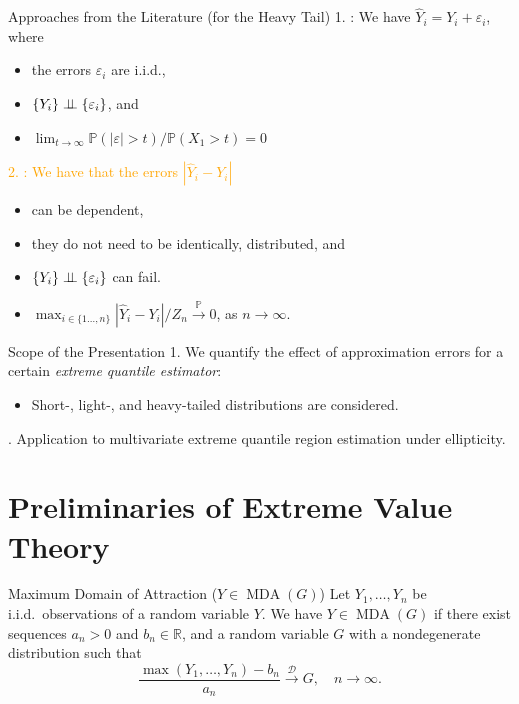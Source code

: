 \documentclass{beamer}
\DeclareMathOperator{\mda}{MDA}
\begin{document}

\begin{frame}{Approaches from the Literature (for the Heavy Tail)}
  1. \parencite{kim2020, kim2023b}: We have $\hat Y_i = Y_i + \varepsilon_i$, where
  \begin{itemize}
    \item the errors $\varepsilon_i$ are i.i.d.,
    \item $\{Y_i\} \perp\kern-5pt \perp\{\varepsilon_i\}$, and
    \item $\lim_{t\to\infty}\mathbb{P}(|\varepsilon| > t)/\mathbb{P}(X_1 > t) = 0$
  \end{itemize}
  \pause
  \textcolor{orange}{2. \parencite{girard2021}: We have that the errors $|\hat
  Y_i - Y_i|$}
  \begin{itemize}
    \item can be dependent,
    \item they do not need to be identically, distributed, and
    \item $\{Y_i\} \perp\kern-5pt \perp\{\varepsilon_i\}$ can fail.
    \item $\max_{i\in\{1\ldots, n\}}|\hat Y_i -
    Y_i|/Z_n\stackrel{\mathbb{P}}{\to} 0$, as $n\to\infty$.
    \end{itemize}
\end{frame}


\begin{frame}{Scope of the Presentation}
  1. We quantify the effect of approximation errors for a certain \emph{extreme
  quantile estimator}:
  \begin{itemize}
    \item Short-, light-, and heavy-tailed distributions are considered. 
  \end{itemize}
  . Application to multivariate extreme quantile region estimation under
  ellipticity.
\end{frame}


\section{Preliminaries of Extreme Value Theory}


\begin{frame}{Maximum Domain of Attraction ($Y\in \mda\left(G\right)$)}
  Let $Y_1, \ldots, Y_n$ be i.i.d.\ observations of a random variable $Y$. We
  have $Y\in\mda\left(G\right)$ if there exist sequences $a_n > 0$ and
  $b_n\in\mathbb{R}$, and a random variable $G$ with a nondegenerate
  distribution such that
\begin{equation*}
	\frac{\max\left(Y_1, \ldots, Y_n\right) - b_n}{a_n}
  \stackrel{\mathcal{D}}{\to} G, \quad n\to\infty.
\end{equation*}
\end{frame}
\end{document}
